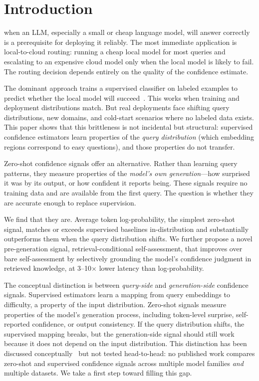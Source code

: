 \documentclass[journal]{IEEEtran}
\begin{document}
\section{Introduction}
\label{sec:intro}

 when an LLM, especially a small or cheap language model, will answer correctly is a prerequisite for deploying it reliably. The most immediate application is local-to-cloud routing: running a cheap local model for most queries and escalating to an expensive cloud model only when the local model is likely to fail. The routing decision depends entirely on the quality of the confidence estimate.

The dominant approach trains a supervised classifier on labeled examples to predict whether the local model will succeed~\cite{ong2024routellm}. This works when training and deployment distributions match. But real deployments face shifting query distributions, new domains, and cold-start scenarios where no labeled data exists. This paper shows that this brittleness is not incidental but structural: supervised confidence estimators learn properties of the \emph{query distribution} (which embedding regions correspond to easy questions), and those properties do not transfer.

Zero-shot confidence signals offer an alternative. Rather than learning query patterns, they measure properties of the \emph{model's own generation}---how surprised it was by its output, or how confident it reports being. These signals require no training data and are available from the first query. The question is whether they are accurate enough to replace supervision.

We find that they are. Average token log-probability, the simplest zero-shot signal, matches or exceeds supervised baselines in-distribution and substantially outperforms them when the query distribution shifts. We further propose a novel pre-generation signal, retrieval-conditional self-assessment, that improves over bare self-assessment by selectively grounding the model's confidence judgment in retrieved knowledge, at 3--10$\times$ lower latency than log-probability.

The conceptual distinction is between \emph{query-side} and \emph{generation-side} confidence signals. Supervised estimators learn a mapping from query embeddings to difficulty, a property of the input distribution. Zero-shot signals measure properties of the model's generation process, including token-level surprise, self-reported confidence, or output consistency. If the query distribution shifts, the supervised mapping breaks, but the generation-side signal should still work because it does not depend on the input distribution. This distinction has been discussed conceptually~\cite{kadavath2022language,chuang2025confident} but not tested head-to-head: no published work compares zero-shot and supervised confidence signals across multiple model families \emph{and} multiple datasets. We take a first step toward filling this gap.
\end{document}

